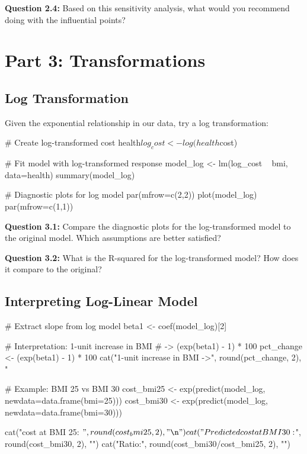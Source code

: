 \documentclass[11pt]{article}
\begin{document}
\textbf{Question 2.4:} Based on this sensitivity analysis, what would you recommend doing with the influential points?

\vspace{0.5cm}

\section{Part 3: Transformations}

\subsection{Log Transformation}

Given the exponential relationship in our data, try a log transformation:

\begin{rcode}
# Create log-transformed cost
health$log_cost <- log(health$cost)

# Fit model with log-transformed response
model_log <- lm(log_cost ~ bmi, data=health)
summary(model_log)

# Diagnostic plots for log model
par(mfrow=c(2,2))
plot(model_log)
par(mfrow=c(1,1))
\end{rcode}

\textbf{Question 3.1:} Compare the diagnostic plots for the log-transformed model to the original model. Which assumptions are better satisfied?

\vspace{0.5cm}

\textbf{Question 3.2:} What is the R-squared for the log-transformed model? How does it compare to the original?

\vspace{0.5cm}

\subsection{Interpreting Log-Linear Model}

\begin{rcode}
# Extract slope from log model
beta1 <- coef(model_log)[2]

# Interpretation: 1-unit increase in BMI
# -> (exp(beta1) - 1) * 100%
pct_change <- (exp(beta1) - 1) * 100
cat("1-unit increase in BMI ->",
    round(pct_change, 2), "%

# Example: BMI 25 vs BMI 30
cost_bmi25 <- exp(predict(model_log,
                          newdata=data.frame(bmi=25)))
cost_bmi30 <- exp(predict(model_log,
                          newdata=data.frame(bmi=30)))

cat("\nPredicted cost at BMI 25: $",
    round(cost_bmi25, 2), "\n")
cat("Predicted cost at BMI 30: $",
    round(cost_bmi30, 2), "\n")
cat("Ratio:", round(cost_bmi30/cost_bmi25, 2), "\n")
\end{rcode}
\end{document}
